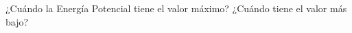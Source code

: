 ¿Cuándo la Energía Potencial tiene el valor máximo? ¿Cuándo tiene el valor más bajo?


\begin{solutionbox}{1.8cm}

\end{solutionbox}

